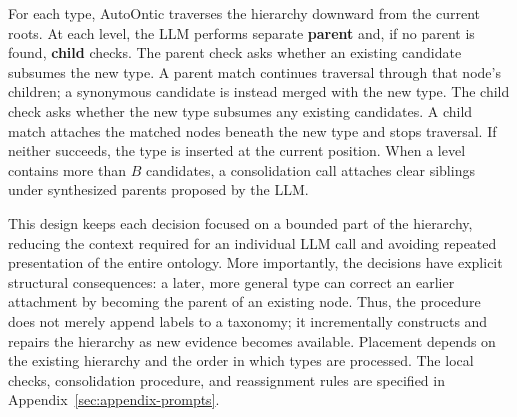 \documentclass[11pt]{article}
\begin{document}
For each type, AutoOntic traverses the hierarchy downward from the current roots. At each level, the LLM performs separate \textbf{parent} and, if no parent is found, \textbf{child} checks. The parent check asks whether an existing candidate subsumes the new type. A parent match continues traversal through that node's children; a synonymous candidate is instead merged with the new type. The child check asks whether the new type subsumes any existing candidates. A child match attaches the matched nodes beneath the new type and stops traversal. If neither succeeds, the type is inserted at the current position. When a level contains more than $B$ candidates, a consolidation call attaches clear siblings under synthesized parents proposed by the LLM.

This design keeps each decision focused on a bounded part of the hierarchy, reducing the context required for an individual LLM call and avoiding repeated presentation of the entire ontology. More importantly, the decisions have explicit structural consequences: a later, more general type can correct an earlier attachment by becoming the parent of an existing node. Thus, the procedure does not merely append labels to a taxonomy; it incrementally constructs and repairs the hierarchy as new evidence becomes available. Placement depends on the existing hierarchy and the order in which types are processed. The local checks, consolidation procedure, and reassignment rules are specified in Appendix~\ref{sec:appendix-prompts}.
\end{document}
